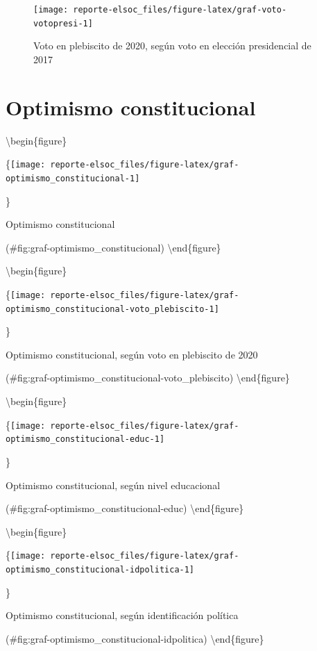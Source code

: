 \documentclass[
  12pt,
]{book}
\begin{document}
\begin{figure}

{\centering \texttt{[image: reporte-elsoc\_files/figure-latex/graf-voto-votopresi-1]} 

}

\caption{Voto en plebiscito de 2020, según voto en elección presidencial de 2017}\label{fig:graf-voto-votopresi}
\end{figure}

\hypertarget{optimismo-constitucional}{%
\section{Optimismo constitucional}\label{optimismo-constitucional}}

\textbackslash begin\{figure\}

\{\centering \texttt{[image: reporte-elsoc\_files/figure-latex/graf-optimismo\_constitucional-1]}

\}

\caption{Optimismo constitucional}

(\#fig:graf-optimismo\_constitucional)
\textbackslash end\{figure\}

\textbackslash begin\{figure\}

\{\centering \texttt{[image: reporte-elsoc\_files/figure-latex/graf-optimismo\_constitucional-voto\_plebiscito-1]}

\}

\caption{Optimismo constitucional, según voto en plebiscito de 2020}

(\#fig:graf-optimismo\_constitucional-voto\_plebiscito)
\textbackslash end\{figure\}

\textbackslash begin\{figure\}

\{\centering \texttt{[image: reporte-elsoc\_files/figure-latex/graf-optimismo\_constitucional-educ-1]}

\}

\caption{Optimismo constitucional, según nivel educacional}

(\#fig:graf-optimismo\_constitucional-educ)
\textbackslash end\{figure\}

\textbackslash begin\{figure\}

\{\centering \texttt{[image: reporte-elsoc\_files/figure-latex/graf-optimismo\_constitucional-idpolitica-1]}

\}

\caption{Optimismo constitucional, según identificación política}

(\#fig:graf-optimismo\_constitucional-idpolitica)
\textbackslash end\{figure\}
\end{document}
